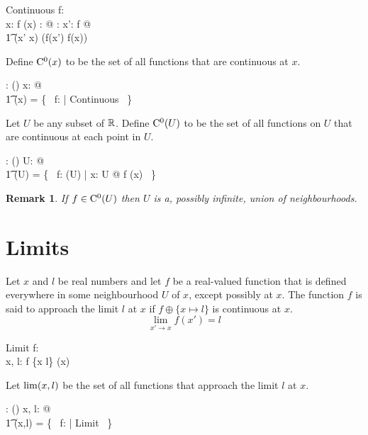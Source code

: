 \documentclass[11pt, oneside]{article}
\newtheorem*{remark}{Remark}
\begin{document}
\begin{schema}{Continuous}
	f: \R \pfun \R \\
	x: \R
\where
	f \in \FunR(x)
\also
	\forall \epsilon: \Rpos @ \exists \delta: \Rpos@ \forall x': \dom f @ \\
	\t1	\absR(x' \subR x) \ltR \delta \implies \absR(f(x') \subR f(x)) \ltR \epsilon
\end{schema}

Define $\operatorname{C^0}(x)$ to be the set of all functions that are continuous at $x$.
\begin{axdef}
	\CzeroR: \R \fun \power(\R \pfun \R)
\where
	\forall x: \R @ \\
	\t1	\CzeroR(x) = \{~ f: \R \pfun \R | Continuous ~\}
\end{axdef}

Let $U$ be any subset of $\mathbb{R}$. 
Define $\operatorname{C^0}(U)$ to be the set of all functions on $U$ that are continuous at each point in $U$.
\begin{axdef}
	\CzeroPR: \power \R \fun \power (\R \pfun \R)
\where
	\forall U: \power \R @ \\
	\t1	\CzeroPR(U) = \{~ f: \FunPR(U) | \forall x: U @ f \in   \CzeroR(x) ~\}
\end{axdef}

\begin{remark}
If $f \in \operatorname{C^0}(U)$ then $U$ is a, possibly infinite, union of neighbourhoods.
\end{remark}

\section{Limits}

Let $x$ and $l$ be real numbers and
let $f$ be a real-valued function that is defined everywhere in some
neighbourhood $U$ of $x$, except possibly at $x$.
The function $f$ is said to approach the limit $l$ at $x$ if $f \oplus \{ x \mapsto l \}$ is continuous at $x$.
$$
	\lim_{x' \to x}{f(x')} = l
$$

\begin{schema}{Limit}
	f: \R \pfun \R \\
	x, l: \R
\where
	f \oplus \{x \mapsto l\} \in \CzeroR(x)
\end{schema}

Let $\operatorname{lim}(x,l)$ be the set of all functions that approach the limit $l$ at $x$.
\begin{axdef}
	\limRR: \R \cross \R \fun \power(\R \pfun \R)
\where
	\forall x, l: \R @ \\
	\t1	\limRR(x,l) = \{~ f: \R \pfun \R | Limit ~\}
\end{axdef}
\end{document}
